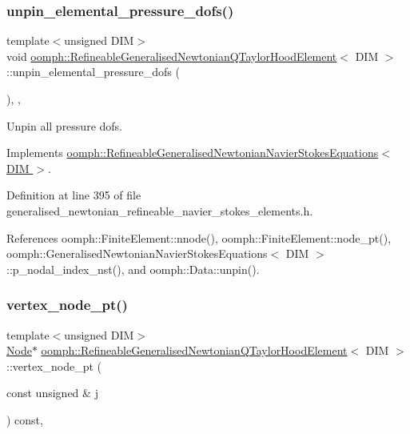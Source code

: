 \subsubsection{\texorpdfstring{unpin\+\_\+elemental\+\_\+pressure\+\_\+dofs()}{unpin\_elemental\_pressure\_dofs()}}
{\footnotesize\ttfamily template$<$unsigned D\+IM$>$ \\
void \hyperlink{classoomph_1_1RefineableGeneralisedNewtonianQTaylorHoodElement}{oomph\+::\+Refineable\+Generalised\+Newtonian\+Q\+Taylor\+Hood\+Element}$<$ D\+IM $>$\+::unpin\+\_\+elemental\+\_\+pressure\+\_\+dofs (\begin{DoxyParamCaption}{ }\end{DoxyParamCaption})\hspace{0.3cm}{\ttfamily [inline]}, {\ttfamily [private]}, {\ttfamily [virtual]}}



Unpin all pressure dofs. 



Implements \hyperlink{classoomph_1_1RefineableGeneralisedNewtonianNavierStokesEquations_a5e80fae3c3c4373e082867a49cc78ad0}{oomph\+::\+Refineable\+Generalised\+Newtonian\+Navier\+Stokes\+Equations$<$ D\+I\+M $>$}.



Definition at line 395 of file generalised\+\_\+newtonian\+\_\+refineable\+\_\+navier\+\_\+stokes\+\_\+elements.\+h.



References oomph\+::\+Finite\+Element\+::nnode(), oomph\+::\+Finite\+Element\+::node\+\_\+pt(), oomph\+::\+Generalised\+Newtonian\+Navier\+Stokes\+Equations$<$ D\+I\+M $>$\+::p\+\_\+nodal\+\_\+index\+\_\+nst(), and oomph\+::\+Data\+::unpin().

\mbox{\label{classoomph_1_1RefineableGeneralisedNewtonianQTaylorHoodElement_aff468e174668cbc2f30c420ec5d2a52b}} 
\subsubsection{\texorpdfstring{vertex\+\_\+node\+\_\+pt()}{vertex\_node\_pt()}}
{\footnotesize\ttfamily template$<$unsigned D\+IM$>$ \\
\hyperlink{classoomph_1_1Node}{Node}$\ast$ \hyperlink{classoomph_1_1RefineableGeneralisedNewtonianQTaylorHoodElement}{oomph\+::\+Refineable\+Generalised\+Newtonian\+Q\+Taylor\+Hood\+Element}$<$ D\+IM $>$\+::vertex\+\_\+node\+\_\+pt (\begin{DoxyParamCaption}\item[{const unsigned \&}]{j }\end{DoxyParamCaption}) const\hspace{0.3cm}{\ttfamily [inline]}, {\ttfamily [virtual]}}



